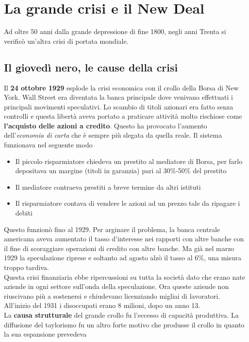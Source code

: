 
\section{La grande crisi e il New Deal}
Ad oltre 50 anni dalla grande depressione di fine 1800, negli anni Trenta si verificò un'altra crisi
di portata mondiale.

\subsection{Il giovedì nero, le cause della crisi}
Il \textbf{24 ottobre 1929} esplode la crisi economica con il crollo della Borsa di New York. Wall
Street era diventata la banca principale dove venivano effettuati i principali movimenti speculativi.
Lo scambio di titoli azionari era fatto senza controlli e questa libertà aveva portato a praticare
attività molto rischiose come \textbf{l'acquisto delle azioni a credito}. Questo ha provocato 
l'aumento dell'\textit{economia di carta} che è sempre più slegata da quella reale. Il sistema
funzionava nel seguente modo
\begin{itemize}
  \item Il piccolo risparmiatore chiedeva un prestito al mediatore di Borsa, per farlo depositava
    un margine (titoli in garanzia) pari al 30\%-50\% del prestito
  \item Il mediatore contraeva prestiti a breve termine da altri istituti
  \item Il risparmiatore contava di vendere le azioni ad un prezzo tale da ripagare i debiti
\end{itemize}
Questo funzionò fino al 1929. Per arginare il problema, la banca centrale americana aveva aumentato
il tasso d'interesse nei rapporti con altre banche con il fine di scoraggiare operazioni di credito
con altre banche. Ma già nel marzo 1929 la speculazione riprese e soltanto ad agosto alzò il tasso
al 6\%, una misura troppo tardiva.\\
Questa crisi finanziaria ebbe ripercussioni su tutta la società dato che erano nate aziende in ogni
settore sull'onda della speculazione. Ora queste aziende non riuscivano più a sostenersi e chiudevano
licenziando migliai di lavoratori. All'inizio del 1931 i disoccupati erano 8 milioni, dopo un anno 
13.\\
La \textbf{causa strutturale} del grande crollo fu l'eccesso di capacità produttiva. La diffusione
del taylorismo fu un altro forte motivo che produsse il crollo in quanto la sua espansione prevedeva

